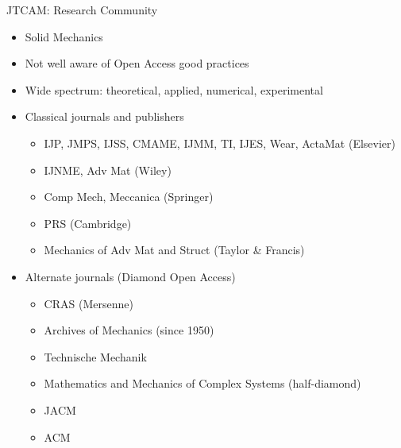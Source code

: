 \documentclass[10pt,compress,serif,aspectratio=169]{beamer}
\begin{document}
\begin{frame}[t]{JTCAM: Research Community}
\begin{itemize}
 \item Solid Mechanics
 \item Not well aware of Open Access good practices
 \item Wide spectrum: theoretical, applied, numerical, experimental
 \item Classical journals and publishers
 \begin{itemize}
 \item IJP, JMPS, IJSS, CMAME, IJMM, TI, IJES, Wear, ActaMat (Elsevier)
 \item IJNME, Adv Mat (Wiley)
 \item Comp Mech, Meccanica (Springer)
 \item PRS (Cambridge)
 \item Mechanics of Adv Mat and Struct (Taylor \& Francis)
 \end{itemize}
 \item Alternate journals (Diamond Open Access)
  \begin{itemize}
 \item CRAS (Mersenne)
 \item Archives of Mechanics (since 1950)
 \item Technische Mechanik
 \item Mathematics and Mechanics of Complex Systems (half-diamond)
 \item JACM
 \item ACM
 \end{itemize}
\end{itemize}

\end{frame}

\end{document}
